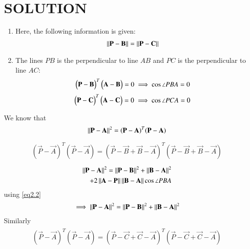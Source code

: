 \documentclass[journal,12pt,twocolumn]{IEEEtran}
\begin{document}
\section{SOLUTION}
\begin{enumerate}
    \item Here, the following information is given:
    \begin{align}
    \left\lVert\mathbf{P}-\mathbf{B}\right\rVert=\left\lVert\mathbf{P}-\mathbf{C}\right\rVert \label{eq2.1}
    \end{align}
    \item The lines $PB$ is the perpendicular to line $AB$ and 
    $PC$ is the perpendicular to line $AC$:
    \begin{align}
    \begin{pmatrix}\mathbf{P}-\mathbf{B}\end{pmatrix}^T\begin{pmatrix}\mathbf{A}-\mathbf{B}\end{pmatrix}=0 \label{eq2.2}
    \implies \cos\angle PBA=0 
    \end{align}
    \begin{align}
    \begin{pmatrix}\mathbf{P}-\mathbf{C}\end{pmatrix}^T\begin{pmatrix}\mathbf{A}-\mathbf{C}\end{pmatrix}=0 \label{eq2.3}
    \implies \cos\angle PCA=0 
    \end{align}
\end{enumerate}
We know that 
\begin{align}
\left\lVert\mathbf{P-A}\right\rVert^2=(\mathbf{P}-\mathbf{A})^T(\mathbf{P}-\mathbf{A})
\end{align}
\begin{align}
 \begin{split}
(\vec{P}-\vec{A})^T(\vec{P}-\vec{A})=(\vec{P}-\vec{B}+\vec{B}-\vec{A})^T(\vec{P}-\vec{B}+\vec{B}-\vec{A})
\end{split}
\end{align}
\begin{align}
 \begin{split}
\left\lVert\mathbf{P-A}\right\rVert^2=\left\lVert\mathbf{P-B}\right\rVert^2+\left\lVert\mathbf{B-A}\right\rVert^2\\ 
+2\left\lVert\mathbf{A}-\mathbf{P}\right\rVert\left\lVert\mathbf{B}-\mathbf{A}\right\rVert\cos\angle PBA \\
\end{split}
\end{align}
using \eqref{eq2.2}
\begin{align}
 \begin{split}
 \implies \left\lVert\mathbf{P-A}\right\rVert^2=\left\lVert\mathbf{P-B}\right\rVert^2+\left\lVert\mathbf{B-A}\right\rVert^2 \label{eq2.4} \\
 \end{split}
\end{align}
Similarly
\begin{align}
 \begin{split}
(\vec{P}-\vec{A})^T(\vec{P}-\vec{A})=(\vec{P}-\vec{C}+\vec{C}-\vec{A})^T(\vec{P}-\vec{C}+\vec{C}-\vec{A})
\end{split}
\end{align}
\end{document}
